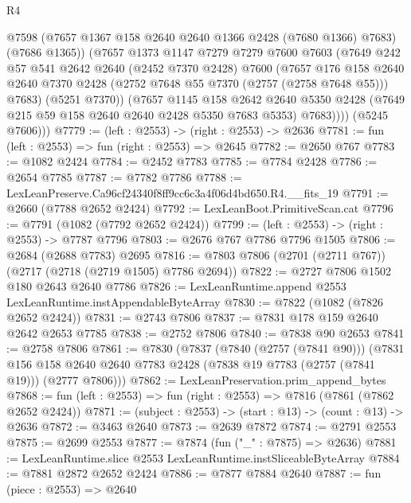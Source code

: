 \begin{lexlean}{R4}
\begin{coremodule}
              @7598
              (@7657 @1367 @158 @2640 @2640 @1366 @2428 (@7680 @1366) @7683)
              (@7686 @1365))
            (@7657
              @1373
              @1147
              @7279
              @7279
              @7600
              @7603
              (@7649
                @242
                @57
                @541
                @2642
                @2640
                (@2452 @7370 @2428)
                @7600
                (@7657
                  @176
                  @158
                  @2640
                  @2640
                  @7370
                  @2428
                  (@2752 @7648 @55 @7370 (@2757 (@2758 @7648 @55)))
                  @7683)
                (@5251 @7370))
              (@7657
                @1145
                @158
                @2642
                @2640
                @5350
                @2428
                (@7649 @215 @59 @158 @2640 @2640 @2428 @5350 @7683 @5353)
                @7683))))
        (@5245 @7606)))
@7779 := (left : @2553) -> (right : @2553) -> @2636
@7781 := fun (left : @2553) => fun (right : @2553) => @2645
@7782 := @2650 @767
@7783 := @1082 @2424
@7784 := @2452 @7783
@7785 := @7784 @2428
@7786 := @2654 @7785
@7787 := @7782 @7786
@7788 := LexLeanPreserve.Ca96cf24340f8ff9cc6c3a4f06d4bd650.R4.__fits_19
@7791 := @2660 (@7788 @2652 @2424)
@7792 := LexLeanBoot.PrimitiveScan.cat
@7796 := @7791 (@1082 (@7792 @2652 @2424))
@7799 := (left : @2553) -> (right : @2553) -> @7787 @7796
@7803 := @2676 @767 @7786 @7796 @1505
@7806 := @2684 (@2688 @7783) @2695
@7816 := @7803 @7806 (@2701 (@2711 @767)) (@2717 (@2718 (@2719 @1505) @7786 @2694))
@7822 := @2727 @7806 @1502 @180 @2643 @2640 @7786
@7826 := LexLeanRuntime.append @2553 LexLeanRuntime.instAppendableByteArray
@7830 := @7822 (@1082 (@7826 @2652 @2424))
@7831 := @2743 @7806
@7837 := @7831 @178 @159 @2640 @2642 @2653 @7785
@7838 := @2752 @7806
@7840 := @7838 @90 @2653
@7841 := @2758 @7806
@7861 := @7830
    (@7837
      (@7840 (@2757 (@7841 @90)))
      (@7831 @156 @158 @2640 @2640 @7783 @2428 (@7838 @19 @7783 (@2757 (@7841 @19))) (@2777 @7806)))
@7862 := LexLeanPreservation.prim_append_bytes
@7868 := fun (left : @2553) => fun (right : @2553) => @7816 (@7861 (@7862 @2652 @2424))
@7871 := (subject : @2553) -> (start : @13) -> (count : @13) -> @2636
@7872 := @3463 @2640
@7873 := @2639 @7872
@7874 := @2791 @2553
@7875 := @2699 @2553
@7877 := @7874 (fun ("_" : @7875) => @2636)
@7881 := LexLeanRuntime.slice @2553 LexLeanRuntime.instSliceableByteArray
@7884 := @7881 @2872 @2652 @2424
@7886 := @7877 @7884 @2640
@7887 := fun (piece : @2553) => @2640

\end{coremodule}
\end{lexlean}
